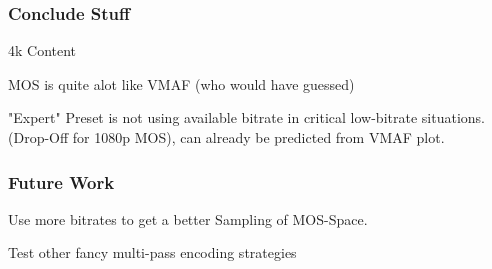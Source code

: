 \subsubsection{Conclude Stuff}
4k Content

MOS is quite alot like VMAF (who would have guessed)


"Expert" Preset is not using available bitrate in critical low-bitrate situations. (Drop-Off for 1080p MOS), can already be predicted from VMAF plot.


\subsubsection{Future Work}
Use more bitrates to get a better Sampling of MOS-Space.


Test other fancy multi-pass encoding strategies